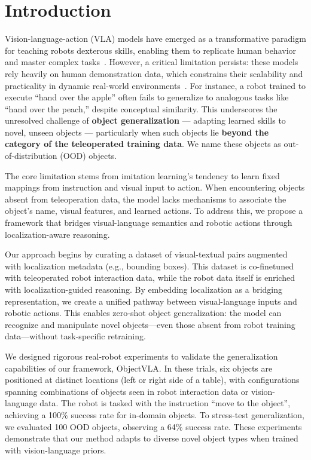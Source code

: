 \section{Introduction}

Vision-language-action (VLA) models have emerged as a transformative paradigm for teaching robots dexterous skills, enabling them to replicate human behavior and master complex tasks~\cite{brohan2022rt-1,rt-2, [pi0, pertsch2025fast,ecot}. However, a critical limitation persists: these models rely heavily on human demonstration data, which constrains their scalability and practicality in dynamic real-world environments~\cite{kim24openvla,wen2024tinyvla,wen2024diffusionvla}. For instance, a robot trained to execute “hand over the apple” often fails to generalize to analogous tasks like “hand over the peach,” despite conceptual similarity. This underscores the unresolved challenge of \textbf{object generalization} — adapting learned skills to novel, unseen objects — particularly when such objects lie \textbf{beyond the category of the teleoperated training data}. We name these objects as out-of-distribution (OOD) objects.

The core limitation stems from imitation learning’s tendency to learn fixed mappings from instruction and visual input to action. When encountering objects absent from teleoperation data, the model lacks mechanisms to associate the object’s name, visual features, and learned actions. To address this, we propose a framework that bridges visual-language semantics and robotic actions through localization-aware reasoning.

Our approach begins by curating a dataset of visual-textual pairs augmented with localization metadata (e.g., bounding boxes). This dataset is co-finetuned with teleoperated robot interaction data, while the robot data itself is enriched with localization-guided reasoning. By embedding localization as a bridging representation, we create a unified pathway between visual-language inputs and robotic actions. This enables zero-shot object generalization: the model can recognize and manipulate novel objects—even those absent from robot training data—without task-specific retraining.

We designed rigorous real-robot experiments to validate the generalization capabilities of our framework, ObjectVLA. In these trials, six objects are positioned at distinct locations (left or right side of a table), with configurations spanning combinations of objects seen in robot interaction data or vision-language data. The robot is tasked with the instruction “move to the {object}”, achieving a 100\% success rate for in-domain objects. To stress-test generalization, we evaluated 100 OOD objects, observing a 64\% success rate. These experiments demonstrate that our method adapts to diverse novel object types when trained with vision-language priors. 

